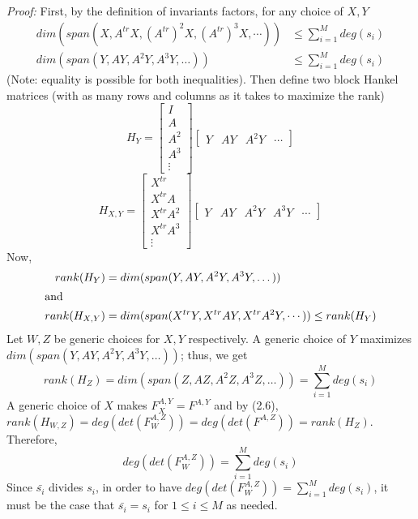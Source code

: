 \documentclass[12pt]{article}
\begin{document}
\noindent\textit{Proof:} First, by the definition of invariants
factors, for any choice of $X,Y$
\begin{align*}
	dim(span(X,A^{tr}X,(A^{tr})^2X, (A^{tr})^3X,\cdots)) &\le \sum_{i=1}^{M} deg(s_i)\\
	dim(span(Y,AY,A^2Y,A^3Y,\dots)) &\le \sum_{i=1}^{M} deg(s_i)
\end{align*}
(Note: equality is possible for both inequalities). Then define two block Hankel matrices (with as many
rows and columns as it takes to maximize the rank)
$$ H_Y =
\begin{bmatrix}
I \\ A \\ A^2 \\ A^3 \\ \vdots
\end{bmatrix}
\begin{bmatrix}
Y & AY &A^2Y & \cdots
\end{bmatrix}
$$
$$ H_{X,Y} =
\begin{bmatrix}
X^{tr} \\ X^{tr}A \\ X^{tr} A^2 \\ X^{tr} A^3 \\ \vdots
\end{bmatrix}
\begin{bmatrix}
Y & AY & A^2Y & A^3Y& \cdots
\end{bmatrix}
$$
Now,
\begin{align*}
rank(H_Y) &= dim(span(Y,AY,A^2Y,A^3Y,\dots))\\ \intertext{and}
rank(H_{X,Y}) &= dim(span(X^{tr}Y,X^{tr}AY,X^{tr}A^2Y,\cdots)) \le rank(H_Y)
\end{align*} 
Let $W,Z$ be generic choices for $X,Y$ respectively.
A generic choice of $Y$ maximizes $dim(span(Y,AY,A^2Y,A^3Y,\dots))$; thus, we get
$$rank(H_Z) = dim(span(Z,AZ,A^2Z,A^3Z,\dots)) = \sum_{i = 1}^{M} deg(s_i)$$
A generic choice of $X$ makes $F_X^{A,Y} = F^{A,Y}$ and by (2.6), 
$rank(H_{W,Z}) = deg(det(F_W^{A,Z})) = deg(det(F^{A,Z})) = rank(H_Z)$. Therefore,
$$deg(det(F_W^{A,Z})) = \sum_{i=1}^{M} deg(s_i)$$
Since $\bar{s_i}$ divides $s_i$, in order to have $deg(det(F_W^{A,Z})) = \sum_{i=1}^{M} deg(s_i)$,
it must be the case that $\bar{s_i} = s_i$ for $1 \le i \le M$ as needed.
\end{document}
